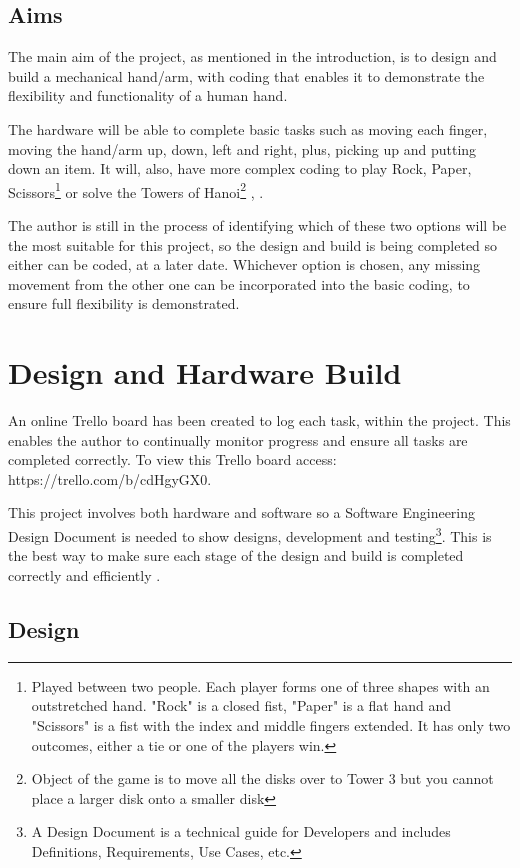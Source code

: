 \documentclass[progress]{cmpreport}
\begin{document}
\subsection{Aims}
The main aim of the project, as mentioned in the introduction, is to design and build a mechanical hand/arm, with coding that enables it to demonstrate the flexibility and functionality of a human hand. 

The hardware will be able to complete basic tasks such as moving each finger, moving the hand/arm up, down, left and right, plus, picking up and putting down an item. It will, also, have more complex coding to play Rock, Paper, Scissors\footnote{Played between two people. Each player forms one of three shapes with an outstretched hand. "Rock" is a closed fist, "Paper" is a flat hand and "Scissors" is a fist with the index and middle fingers extended. It has only two outcomes, either a tie or one of the players win.} or solve the Towers of Hanoi\footnote{Object of the game is to move all the disks over to Tower 3 but you cannot place a larger disk onto a smaller disk} \citep{DBLP:conf/case/ItoSYI16}, \citep{DBLP:journals/corr/abs-cs-0612070}.  

The author is still in the process of identifying which of these two options will be the most suitable for this project, so the design and build is being completed so either can be coded, at a later date. Whichever option is chosen, any missing movement from the other one can be incorporated into the basic coding, to ensure full flexibility is demonstrated. 

\section{Design and Hardware Build}

An online Trello board has been created to log each task, within the project. This enables the author to continually monitor progress and ensure all tasks are completed correctly. To view this Trello board access: https://trello.com/b/cdHgyGX0.

This project involves both hardware and software so a Software Engineering Design Document is needed to show designs, development and testing\footnote{A Design Document is a technical guide for Developers and includes Definitions, Requirements, Use Cases, etc.}. This is the best way to make sure each stage of the design and build is completed correctly and efficiently \citep{mcelrath}.

\subsection{Design}
\end{document}
